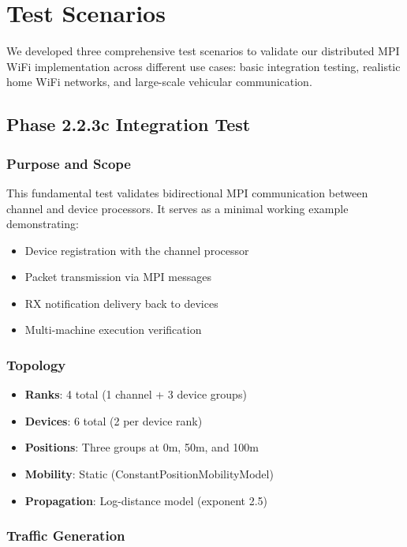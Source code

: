 \section{Test Scenarios}
\label{sec:scenarios}

We developed three comprehensive test scenarios to validate our distributed MPI WiFi implementation across different use cases: basic integration testing, realistic home WiFi networks, and large-scale vehicular communication.

\subsection{Phase 2.2.3c Integration Test}

\subsubsection{Purpose and Scope}

This fundamental test validates bidirectional MPI communication between channel and device processors. It serves as a minimal working example demonstrating:
\begin{itemize}
    \item Device registration with the channel processor
    \item Packet transmission via MPI messages
    \item RX notification delivery back to devices
    \item Multi-machine execution verification
\end{itemize}

\subsubsection{Topology}

\begin{itemize}
    \item \textbf{Ranks}: 4 total (1 channel + 3 device groups)
    \item \textbf{Devices}: 6 total (2 per device rank)
    \item \textbf{Positions}: Three groups at 0m, 50m, and 100m
    \item \textbf{Mobility}: Static (ConstantPositionMobilityModel)
    \item \textbf{Propagation}: Log-distance model (exponent 2.5)
\end{itemize}

\subsubsection{Traffic Generation}

